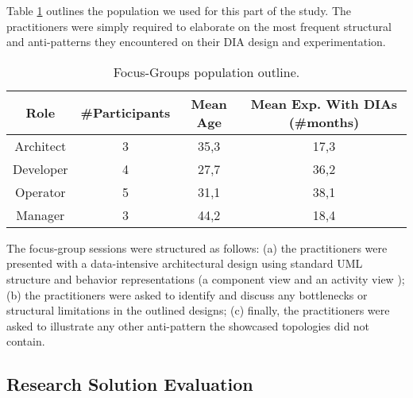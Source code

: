 Table \ref{tabba} outlines the population we used for this part of the study. The practitioners were simply required to elaborate on the most frequent structural and anti-patterns they encountered on their DIA design and experimentation. 

\begin{table}
\caption{Focus-Groups population outline.}\label{tabba}
\begin{tabular}{|c|c|c|c|}
\hline 
\textbf{Role} & \textbf{\#Participants} & \textbf{Mean Age} & \textbf{Mean Exp. With DIAs (\#months)}\tabularnewline
\hline 
Architect & 3 & 35,3 & 17,3\tabularnewline
\hline 
Developer & 4 & 27,7 & 36,2\tabularnewline
\hline 
Operator & 5 & 31,1 & 38,1\tabularnewline
\hline 
Manager & 3 & 44,2 & 18,4\tabularnewline
\hline 
\end{tabular}
\end{table}

The focus-group sessions were structured as follows: (a) the practitioners were presented with a data-intensive architectural design using standard UML structure and behavior representations (a component view and an activity view \cite{NittoJGST16}); (b) the practitioners were asked to identify and discuss any bottlenecks or structural limitations in the outlined designs; (c) finally, the practitioners were asked to illustrate any other anti-pattern the showcased topologies did not contain.

%

\subsection{Research Solution Evaluation}\label{sec:researchsolutioneval}

